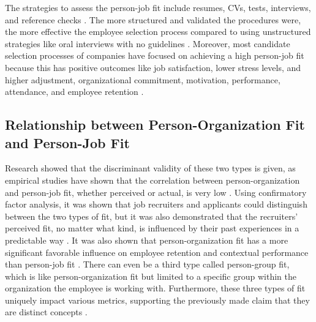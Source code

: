 \documentclass[draft,final]{thesisclass} %
\begin{document}
The strategies to assess the person-job fit include resumes, \acs{CV}s, tests, interviews, and reference checks \parencite[184]{po_and_pj_fit_literature_review}.
The more structured and validated the procedures were, the more effective the employee selection process compared to using unstructured strategies like oral interviews with no guidelines \parencite[184]{po_and_pj_fit_literature_review}.
Moreover, most candidate selection processes of companies have focused on achieving a high person-job fit because this has positive outcomes like job satisfaction, lower stress levels, and higher adjustment, organizational commitment, motivation, performance, attendance, and employee retention \parencite[184]{po_and_pj_fit_literature_review}.

\subsection{Relationship between Person-Organization Fit and Person-Job Fit}
Research showed that the discriminant validity of these two types is given, as empirical studies have shown that the correlation between person-organization and person-job fit, whether perceived or actual, is very low \parencite[185]{po_and_pj_fit_literature_review}.
Using confirmatory factor analysis, it was shown that job recruiters and applicants could distinguish between the two types of fit, but it was also demonstrated that the recruiters' perceived fit, no matter what kind, is influenced by their past experiences in a predictable way \parencite[185]{po_and_pj_fit_literature_review}.
It was also shown that person-organization fit has a more significant favorable influence on employee retention and contextual performance than person-job fit \parencite[185]{po_and_pj_fit_literature_review}.
There can even be a third type called person-group fit, which is like person-organization fit but limited to a specific group within the organization the employee is working with.
Furthermore, these three types of fit uniquely impact various metrics, supporting the previously made claim that they are distinct concepts \parencite[185]{po_and_pj_fit_literature_review}.
\end{document}
